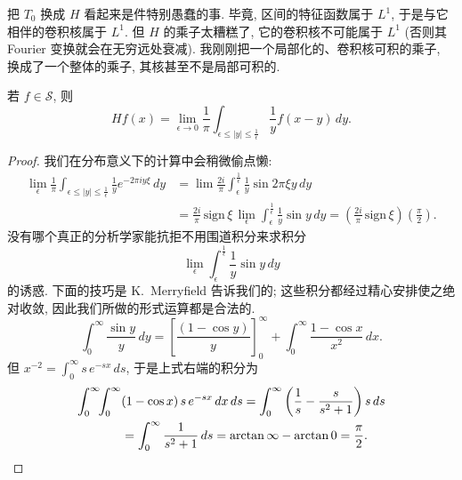 \begin{remark}\label{rem:2.13}
把 $T_0$ 换成 $H$ 看起来是件特别愚蠢的事. 毕竟, 区间的特征函数属于 $L^1$, 于是与它相伴的卷积核属于 $L^1$. 但 $H$ 的乘子太糟糕了, 它的卷积核不可能属于 $L^1$ (否则其 Fourier 变换就会在无穷远处衰减). 我刚刚把一个局部化的、卷积核可积的乘子, 换成了一个整体的乘子, 其核甚至不是局部可积的.
\end{remark}

\begin{proposition}\label{prop:2.14}
若 $f\in\mathcal{S}$, 则
\[
Hf(x)=\lim_{\epsilon\to0}\frac{1}{\pi}\int_{\epsilon\le|y|\le\frac{1}{\epsilon}}\frac{1}{y}f(x-y)\,dy.
\]
\end{proposition}

\begin{proof}
我们在分布意义下的计算中会稍微偷点懒:
\begin{align*}
\lim_{\epsilon}\frac{1}{\pi}\int_{\epsilon\leq|y|\leq\frac{1}{\epsilon}}\frac{1}{y}e^{-2\pi iy\xi}\,dy
&=\lim\frac{2i}{\pi}\int_{\epsilon}^{\frac{1}{\epsilon}}\frac{1}{y}\sin 2\pi\xi y\,dy \\
&=\frac{2i}{\pi}\,\mathrm{sign}\,\xi\,\lim_{\epsilon}\int_{\epsilon}^{\frac{1}{\epsilon}}\frac{1}{y}\sin y\,dy
=\left(\frac{2i}{\pi}\,\mathrm{sign}\,\xi\right)\left(\frac{\pi}{2}\right).
\end{align*}
没有哪个真正的分析学家能抗拒不用围道积分来求积分
\[
\lim_{\epsilon}\int_{\epsilon}^{\frac{1}{\epsilon}}\frac{1}{y}\sin y\,dy
\]
的诱惑. 下面的技巧是 K.~Merryfield 告诉我们的; 这些积分都经过精心安排使之绝对收敛, 因此我们所做的形式运算都是合法的.
\[
\int_{0}^{\infty}\frac{\sin y}{y}\,dy
=\left[\frac{(1-\cos y)}{y}\right]_{0}^{\infty}+\int_{0}^{\infty}\frac{1-\cos x}{x^{2}}\,dx.
\]
但 $x^{-2}=\int_{0}^{\infty}s\,e^{-sx}\,ds$, 于是上式右端的积分为
\begin{align*}
\int_{0}^{\infty}\!\!\int_{0}^{\infty}&(1-\cos x)\,s\,e^{-sx}\,dx\,ds
=\int_{0}^{\infty}\left(\frac{1}{s}-\frac{s}{s^{2}+1}\right)s\,ds \\
&=\int_{0}^{\infty}\frac{1}{s^{2}+1}\,ds=\arctan\infty-\arctan 0=\frac{\pi}{2}. \qedhere
\end{align*}
\end{proof}

